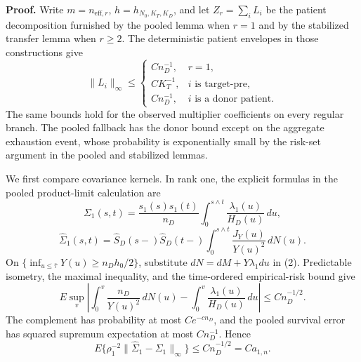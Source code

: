 \textbf{Proof.}
Write \(m=n_{\mathrm{eff},r}\), \(h=h_{N_0,K_T,K_D}\), and let \(Z_r=\sum_iL_i\) be the patient decomposition furnished by the pooled lemma when \(r=1\) and by the stabilized transfer lemma when \(r\ge2\). The deterministic patient envelopes in those constructions give
\[
 \|L_i\|_\infty\le
 \begin{cases}
 Cn_D^{-1},&r=1,\\
 CK_T^{-1},&i\text{ is target-pre},\\
 Cn_D^{-1},&i\text{ is a donor patient}.
 \end{cases}                                                   \tag{1}
\]
The same bounds hold for the observed multiplier coefficients on every regular branch. The pooled fallback has the donor bound except on the aggregate exhaustion event, whose probability is exponentially small by the risk-set argument in the pooled and stabilized lemmas.

We first compare covariance kernels. In rank one, the explicit formulas in the pooled product-limit calculation are
\[
 \Sigma_1(s,t)=\frac{s_1(s)s_1(t)}{n_D}
 \int_0^{s\wedge t}\frac{\lambda_1(u)}{H_D(u)}\,du,
\]
\[
 \widehat\Sigma_1(s,t)=\widehat S_D(s-)\widehat S_D(t-)
 \int_0^{s\wedge t}\frac{J_Y(u)}{Y(u)^2}\,dN(u).          \tag{2}
\]
On \(\{\inf_{u\le\bar\tau}Y(u)\ge n_Dh_0/2\}\), substitute \(dN=dM+Y\lambda_1du\) in (2). Predictable isometry, the maximal inequality, and the time-ordered empirical-risk bound give
\[
 E\sup_v\left|
 \int_0^v\frac{n_D}{Y(u)^2}\,dN(u)
 -\int_0^v\frac{\lambda_1(u)}{H_D(u)}\,du
 \right|\le Cn_D^{-1/2}.                                  \tag{3}
\]
The complement has probability at most \(Ce^{-cn_D}\), and the pooled survival error has squared supremum expectation at most \(Cn_D^{-1}\). Hence
\[
 E\{\rho_1^{-2}\|\widehat\Sigma_1-\Sigma_1\|_\infty\}
 \le Cn_D^{-1/2}=Ca_{1,n}.                                \tag{4}
\]


